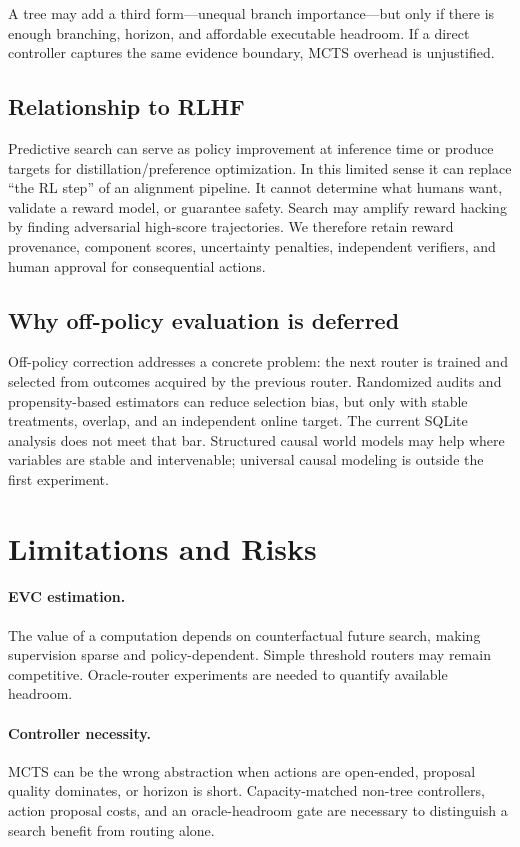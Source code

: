 \documentclass[10pt,twocolumn]{article}
\begin{document}
A tree may add a third form---unequal branch importance---but only if there is
enough branching, horizon, and affordable executable headroom. If a direct
controller captures the same evidence boundary, MCTS overhead is unjustified.

\subsection{Relationship to RLHF}

Predictive search can serve as policy improvement at inference time or produce
targets for distillation/preference optimization. In this limited sense it can
replace ``the RL step'' of an alignment pipeline. It cannot determine what
humans want, validate a reward model, or guarantee safety. Search may amplify
reward hacking by finding adversarial high-score trajectories. We therefore
retain reward provenance, component scores, uncertainty penalties, independent
verifiers, and human approval for consequential actions.

\subsection{Why off-policy evaluation is deferred}

Off-policy correction addresses a concrete problem: the next router is trained
and selected from outcomes acquired by the previous router. Randomized audits
and propensity-based estimators can reduce selection bias, but only with stable
treatments, overlap, and an independent online target. The current SQLite
analysis does not meet that bar. Structured causal world models may help where
variables are stable and intervenable; universal causal modeling is outside the
first experiment.

\section{Limitations and Risks}

\paragraph{EVC estimation.}
The value of a computation depends on counterfactual future search, making
supervision sparse and policy-dependent. Simple threshold routers may remain
competitive. Oracle-router experiments are needed to quantify available
headroom.

\paragraph{Controller necessity.}
MCTS can be the wrong abstraction when actions are open-ended, proposal quality
dominates, or horizon is short. Capacity-matched non-tree controllers, action
proposal costs, and an oracle-headroom gate are necessary to distinguish a
search benefit from routing alone.
\end{document}

